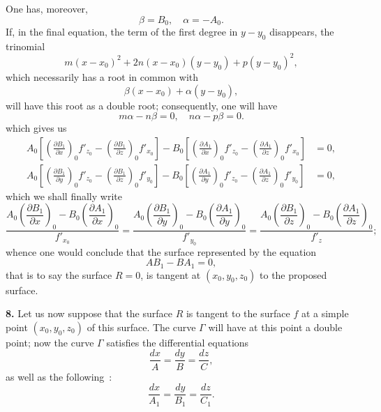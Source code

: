 \documentclass{article}
\begin{document}
One has, moreover,
\[
\beta = B_{0}, \quad \alpha = - A_{0}.
\]
If, in the final equation, the term of the first degree in $y - y_{0}$ disappears, the trinomial
\[
m(x - x_{0})^{2} + 2n(x - x_{0})(y - y_{0}) + p(y - y_{0})^{2},
\]
which necessarily has a root in common with
\[
\beta(x - x_{0}) + \alpha(y - y_{0}),
\]
will have this root as a double root; consequently, one will have
\[
m\alpha - n\beta = 0, \quad n\alpha - p\beta = 0.
\]
which gives us
\[
\begin{aligned}
A_{0} \left[ \left( \frac{\partial B_{1}}{\partial x} \right)_{0} f'_{z_{0}} - \left( \frac{\partial B_{1}}{\partial z} \right)_{0} f'_{x_{0}} \right] - B_{0} \left[ \left( \frac{\partial A_{1}}{\partial x} \right)_{0} f'_{z_{0}} - \left( \frac{\partial A_{1}}{\partial z} \right)_{0} f'_{x_{0}} \right] &= 0, \\
A_{0} \left[ \left( \frac{\partial B_{1}}{\partial y} \right)_{0} f'_{z_{0}} - \left( \frac{\partial B_{1}}{\partial z} \right)_{0} f'_{y_{0}} \right] - B_{0} \left[ \left( \frac{\partial A_{1}}{\partial y} \right)_{0} f'_{z_{0}} - \left( \frac{\partial A_{1}}{\partial z} \right)_{0} f'_{y_{0}} \right] &= 0,
\end{aligned}
\]
which we shall finally write
\[
\frac{A_{0} \left( \dfrac{\partial B_{1}}{\partial x} \right)_{0} - B_{0} \left( \dfrac{\partial A_{1}}{\partial x} \right)_{0}}{f'_{x_{0}}} = \frac{A_{0} \left( \dfrac{\partial B_{1}}{\partial y} \right)_{0} - B_{0} \left( \dfrac{\partial A_{1}}{\partial y} \right)_{0}}{f'_{y_{0}}} = \frac{A_{0} \left( \dfrac{\partial B_{1}}{\partial z} \right)_{0} - B_{0} \left( \dfrac{\partial A_{1}}{\partial z} \right)_{0}}{f'_{z}};
\]
whence one would conclude that the surface represented by the equation
\[
AB_{1} - BA_{1} = 0,
\]
that is to say the surface $R = 0$, is tangent at $(x_{0}, y_{0}, z_{0})$ to the proposed surface.

\textbf{8.} Let us now suppose that the surface $R$ is tangent to the surface $f$ at a simple point $(x_{0}, y_{0}, z_{0})$ of this surface. The curve $\Gamma$ will have at this point a double point; now the curve $\Gamma$ satisfies the differential equations
\[
\frac{dx}{A} = \frac{dy}{B} = \frac{dz}{C},
\]
as well as the following~:
\[
\frac{dx}{A_{1}} = \frac{dy}{B_{1}} = \frac{dz}{C_{1}}.
\]
\end{document}
